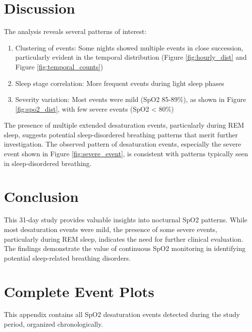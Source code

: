\documentclass{article}
\begin{document}
\section{Discussion}
The analysis reveals several patterns of interest:

\begin{enumerate}
    \item Clustering of events: Some nights showed multiple events in close succession, particularly evident in the temporal distribution (Figure \ref{fig:hourly_dist} and Figure \ref{fig:temporal_counts})
    \item Sleep stage correlation: More frequent events during light sleep phases
    \item Severity variation: Most events were mild (SpO2 85-89\%), as shown in Figure \ref{fig:spo2_dist}, with few severe events (SpO2 < 80\%)
\end{enumerate}

The presence of multiple extended desaturation events, particularly during REM sleep, suggests potential sleep-disordered breathing patterns that merit further investigation. The observed pattern of desaturation events, especially the severe event shown in Figure \ref{fig:severe_event}, is consistent with patterns typically seen in sleep-disordered breathing.

\section{Conclusion}
This 31-day study provides valuable insights into nocturnal SpO2 patterns. While most desaturation events were mild, the presence of some severe events, particularly during REM sleep, indicates the need for further clinical evaluation. The findings demonstrate the value of continuous SpO2 monitoring in identifying potential sleep-related breathing disorders.

\appendix
\section{Complete Event Plots}
This appendix contains all SpO2 desaturation events detected during the study period, organized chronologically.
\end{document}
